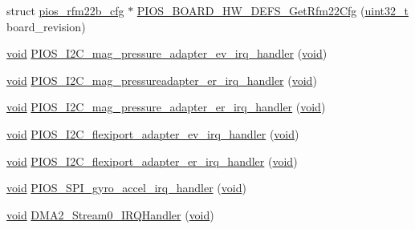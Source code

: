 \begin{DoxyCompactItemize}
\item 
struct \hyperlink{structpios__rfm22b__cfg}{pios\-\_\-rfm22b\-\_\-cfg} $\ast$ \hyperlink{group___tau_labs_core_ga99e015ce128e98cd44d89735a04124c9}{P\-I\-O\-S\-\_\-\-B\-O\-A\-R\-D\-\_\-\-H\-W\-\_\-\-D\-E\-F\-S\-\_\-\-Get\-Rfm22\-Cfg} (\hyperlink{stdint_8h_a435d1572bf3f880d55459d9805097f62}{uint32\-\_\-t} board\-\_\-revision)
\item 
\hyperlink{group___n_a_m_e_ga18028b8badbf1ea7e704ccac3c488e82}{void} \hyperlink{group___tau_labs_core_ga5be1ce2e09e73528c83cca2d79ac0b32}{P\-I\-O\-S\-\_\-\-I2\-C\-\_\-mag\-\_\-pressure\-\_\-adapter\-\_\-ev\-\_\-irq\-\_\-handler} (\hyperlink{group___n_a_m_e_ga18028b8badbf1ea7e704ccac3c488e82}{void})
\item 
\hyperlink{group___n_a_m_e_ga18028b8badbf1ea7e704ccac3c488e82}{void} \hyperlink{group___tau_labs_core_gaa4478a056a506c7f1b70511154e01a86}{P\-I\-O\-S\-\_\-\-I2\-C\-\_\-mag\-\_\-pressureadapter\-\_\-er\-\_\-irq\-\_\-handler} (\hyperlink{group___n_a_m_e_ga18028b8badbf1ea7e704ccac3c488e82}{void})
\item 
\hyperlink{group___n_a_m_e_ga18028b8badbf1ea7e704ccac3c488e82}{void} \hyperlink{group___tau_labs_core_ga2e3548269efcf5e015d952b7f69b67c1}{P\-I\-O\-S\-\_\-\-I2\-C\-\_\-mag\-\_\-pressure\-\_\-adapter\-\_\-er\-\_\-irq\-\_\-handler} (\hyperlink{group___n_a_m_e_ga18028b8badbf1ea7e704ccac3c488e82}{void})
\item 
\hyperlink{group___n_a_m_e_ga18028b8badbf1ea7e704ccac3c488e82}{void} \hyperlink{group___tau_labs_core_ga0b5322143194be1bdf24d9cc88ca275e}{P\-I\-O\-S\-\_\-\-I2\-C\-\_\-flexiport\-\_\-adapter\-\_\-ev\-\_\-irq\-\_\-handler} (\hyperlink{group___n_a_m_e_ga18028b8badbf1ea7e704ccac3c488e82}{void})
\item 
\hyperlink{group___n_a_m_e_ga18028b8badbf1ea7e704ccac3c488e82}{void} \hyperlink{group___tau_labs_core_ga7ae5d4453562364b12d1a9a55c2c9717}{P\-I\-O\-S\-\_\-\-I2\-C\-\_\-flexiport\-\_\-adapter\-\_\-er\-\_\-irq\-\_\-handler} (\hyperlink{group___n_a_m_e_ga18028b8badbf1ea7e704ccac3c488e82}{void})
\item 
\hyperlink{group___n_a_m_e_ga18028b8badbf1ea7e704ccac3c488e82}{void} \hyperlink{group___tau_labs_core_gaa7e73d97eed5be2121aeced598472ba8}{P\-I\-O\-S\-\_\-\-S\-P\-I\-\_\-gyro\-\_\-accel\-\_\-irq\-\_\-handler} (\hyperlink{group___n_a_m_e_ga18028b8badbf1ea7e704ccac3c488e82}{void})
\item 
\hyperlink{group___n_a_m_e_ga18028b8badbf1ea7e704ccac3c488e82}{void} \hyperlink{group___tau_labs_core_gaaf6ce196dde98712e1223b99766e06c0}{D\-M\-A2\-\_\-\-Stream0\-\_\-\-I\-R\-Q\-Handler} (\hyperlink{group___n_a_m_e_ga18028b8badbf1ea7e704ccac3c488e82}{void})

\end{DoxyCompactItemize}
